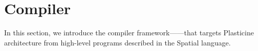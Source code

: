 \chapter{Compiler} \label{sec:compiler}

In this section, we introduce the compiler framework---\name---that targets Plasticine
architecture from high-level programs described in the Spatial language. 
